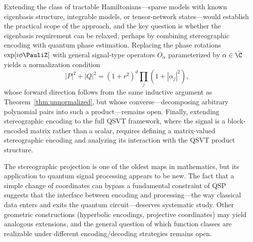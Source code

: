 Extending the class of tractable Hamiltonians---sparse models
with known eigenbasis structure, integrable models, or
tensor-network states---would establish the practical scope of
the approach, and the key question is whether the eigenbasis
requirement can be relaxed, perhaps by combining stereographic
encoding with quantum phase estimation.  Replacing the phase
rotations $\exp[i\phi\PauliZ]$ with general signal-type
operators $O_\alpha$ parameterized by $\alpha \in \hat{\C}$
yields a normalization condition
\begin{equation}
	|P|^2 + |Q|^2 = (1{+}r^2)^d \textstyle\prod_j(1{+}|\alpha_j|^2),
	\label{eq:generalized-norm}
\end{equation}
whose forward direction follows from the same inductive
argument as Theorem~\ref{thm:unnormalized}, but whose
converse---decomposing arbitrary polynomial pairs into such a
product---remains open.  Finally, extending stereographic
encoding to the full QSVT framework, where the signal is a
block-encoded matrix rather than a scalar, requires defining a
matrix-valued stereographic encoding and analyzing its
interaction with the QSVT product structure.

The stereographic projection is one of the oldest maps in
mathematics, but its application to quantum signal processing
appears to be new.  The fact that a simple change of
coordinates can bypass a fundamental constraint of QSP suggests
that the interface between encoding and processing---the way
classical data enters and exits the quantum circuit---deserves
systematic study.  Other geometric constructions (hyperbolic
encodings, projective coordinates) may yield analogous
extensions, and the general question of which function classes
are realizable under different encoding/decoding strategies
remains open.
